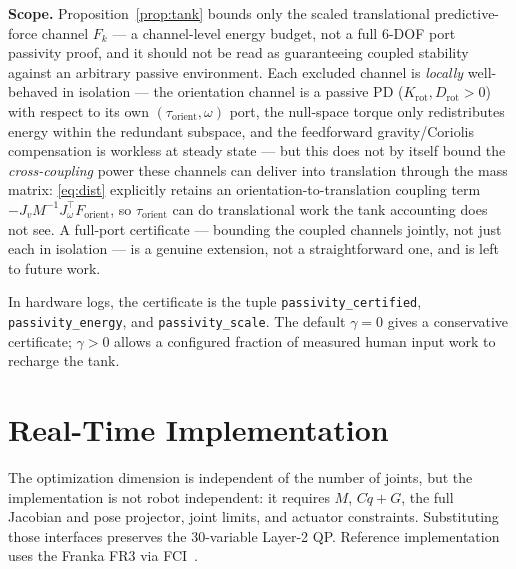 \documentclass[journal]{IEEEtran}
\begin{document}
\textbf{Scope.} Proposition~\ref{prop:tank} bounds only the scaled
translational predictive-force channel $F_k$ --- a channel-level energy
budget, not a full 6-DOF port passivity proof, and it should not be read
as guaranteeing coupled stability against an arbitrary passive
environment. Each excluded channel is \emph{locally} well-behaved in
isolation --- the orientation channel is a passive PD
($K_{\text{rot}},D_{\text{rot}}>0$) with respect to its own
$(\tau_{\text{orient}},\omega)$ port, the null-space torque only
redistributes energy within the redundant subspace, and the feedforward
gravity/Coriolis compensation is workless at steady state --- but this
does not by itself bound the \emph{cross-coupling} power these channels
can deliver into translation through the mass matrix:
\eqref{eq:dist} explicitly retains an orientation-to-translation coupling
term $-J_vM^{-1}J_\omega^\top F_{\text{orient}}$, so $\tau_{\text{orient}}$
can do translational work the tank accounting does not see. A full-port
certificate --- bounding the coupled channels jointly, not just each in
isolation --- is a genuine extension, not a straightforward one, and is
left to future work.

In hardware logs, the certificate is the tuple
\texttt{passivity\_certified}, \texttt{passivity\_energy}, and
\texttt{passivity\_scale}. The default $\gamma=0$ gives a conservative
certificate; $\gamma>0$ allows a configured fraction of measured human input
work to recharge the tank.

\section{Real-Time Implementation}

The optimization dimension is independent of the number of joints, but the
implementation is not robot independent: it requires $M$, $C\dot q+G$, the
full Jacobian and pose projector, joint limits, and actuator constraints.
Substituting those interfaces preserves the 30-variable Layer-2 QP.
Reference implementation uses the Franka FR3 via
FCI~\cite{franka2023fr3}.
\end{document}
